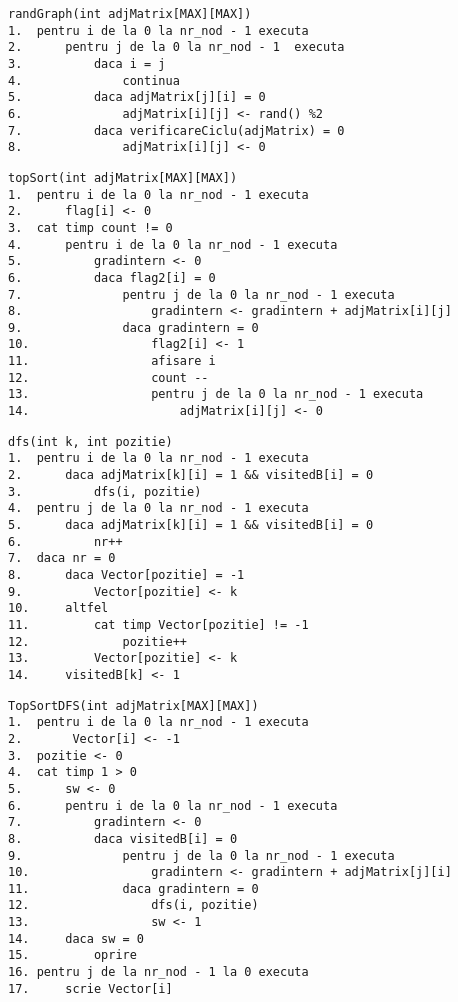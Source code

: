 \documentclass[14pt]{article}
\begin{document}
\begin{lstlisting}
randGraph(int adjMatrix[MAX][MAX])
1.	pentru i de la 0 la nr_nod - 1 executa
2.      pentru j de la 0 la nr_nod - 1  executa
3.          daca i = j 
4.              continua
5.          daca adjMatrix[j][i] = 0
6.              adjMatrix[i][j] <- rand() %2
7.          daca verificareCiclu(adjMatrix) = 0 
8.              adjMatrix[i][j] <- 0
\end{lstlisting}
\begin{lstlisting}
topSort(int adjMatrix[MAX][MAX])
1. 	pentru i de la 0 la nr_nod - 1 executa
2.      flag[i] <- 0
3.  cat timp count != 0
4.      pentru i de la 0 la nr_nod - 1 executa
5.          gradintern <- 0
6.          daca flag2[i] = 0
7.              pentru j de la 0 la nr_nod - 1 executa
8.			        gradintern <- gradintern + adjMatrix[i][j]
9.				daca gradintern = 0
10.                 flag2[i] <- 1
11.			        afisare i
12.                 count --
13.                 pentru j de la 0 la nr_nod - 1 executa
14.                     adjMatrix[i][j] <- 0
\end{lstlisting}
\begin{lstlisting}
dfs(int k, int pozitie)
1.  pentru i de la 0 la nr_nod - 1 executa
2.      daca adjMatrix[k][i] = 1 && visitedB[i] = 0
3.          dfs(i, pozitie)
4.  pentru j de la 0 la nr_nod - 1 executa
5.      daca adjMatrix[k][i] = 1 && visitedB[i] = 0
6.          nr++
7.  daca nr = 0 
8.      daca Vector[pozitie] = -1
9.          Vector[pozitie] <- k
10.     altfel 
11.         cat timp Vector[pozitie] != -1
12.             pozitie++
13.         Vector[pozitie] <- k
14.     visitedB[k] <- 1
\end{lstlisting}
\begin{lstlisting}
TopSortDFS(int adjMatrix[MAX][MAX])
1.  pentru i de la 0 la nr_nod - 1 executa
2.       Vector[i] <- -1
3.  pozitie <- 0
4.  cat timp 1 > 0
5.      sw <- 0
6.      pentru i de la 0 la nr_nod - 1 executa
7.          gradintern <- 0
8.          daca visitedB[i] = 0
9.              pentru j de la 0 la nr_nod - 1 executa
10.                 gradintern <- gradintern + adjMatrix[j][i]
11.             daca gradintern = 0
12.                 dfs(i, pozitie)
13.                 sw <- 1
14.     daca sw = 0
15.         oprire
16. pentru j de la nr_nod - 1 la 0 executa
17.     scrie Vector[i]
\end{lstlisting}



\newpage
\end{document}
